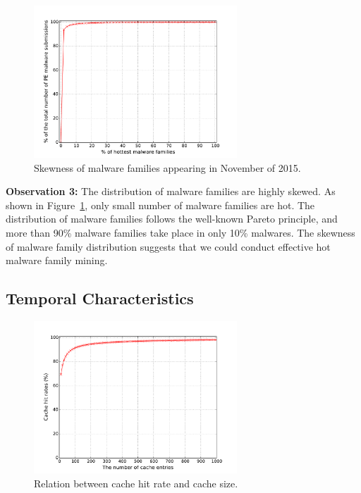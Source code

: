 \begin{figure}[t!]
\begin{center}
\includegraphics[width=3.0in]{figure/cum}
\caption{Skewness of malware families appearing in November of 2015.}
\label{fig:acum}
\end{center}
\end{figure}

{\bf Observation 3:} 
The distribution of malware families are highly skewed. 
As shown in Figure~\ref{fig:acum}, only small number of malware families are hot.
The distribution of malware families follows the well-known Pareto principle, 
and more than 90\% malware families take place in only 10\% malwares. 
The skewness of malware family distribution suggests that we could conduct effective hot malware family mining. 


\subsection{Temporal Characteristics}
\label{sec:predict}


\begin{figure}[t!]
\begin{center}
\includegraphics[width=3.0in]{figure/LRU}
\caption{Relation between cache hit rate and cache size.}
\label{fig:cache}
\end{center}
\end{figure}


